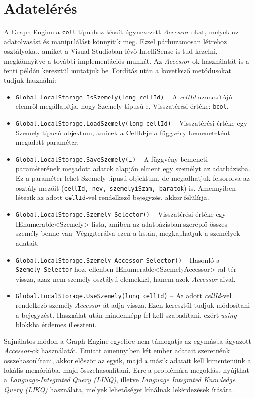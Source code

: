 \section{Adatelérés}

A Graph Engine a \texttt{cell} típushoz készít úgynevezett \emph{Accessor}-okat, melyek az adatolvasást és manipulálást könnyítik meg. Ezzel párhuzamosan létrehoz osztályokat, amiket a Visual Studioban lévő IntelliSense is tud kezelni, megkönnyítve a további implementációs munkát. Az \emph{Accessor}-ok használatát is a fenti példán keresztül mutatjuk be. Fordítás után a következő metódusokat tudjuk használni: 
\begin{itemize}
	\item \texttt{Global.LocalStorage.IsSzemely(long cellId)} \--- A \emph{cellId} azonosítójú elemről megállapítja, hogy Szemely típusú-e. Visszatérési értéke: \texttt{bool}.
	\item \texttt{Global.LocalStorage.LoadSzemely(long cellId)} \--- Visszatérési értéke egy Szemely típusú objektum, aminek a CellId-je a függvény bemeneteként megadott paraméter.
	\item \texttt{Global.LocalStorage.SaveSzemely(\ldots{})} \--- A függvény bemeneti paraméterének megadott adatok alapján elment egy személyt az adatbázisba. Ez a paraméter lehet Szemely típusú objektum, de megadhatjuk felsorolva az osztály mezőit (\texttt{cellId, nev, szemelyiSzam, baratok}) is. Amennyiben létezik az adott \texttt{cellId}-vel rendelkező bejegyzés, akkor felülírja.
	\item \texttt{Global.LocalStorage.Szemely\_Selector()} \--- Visszatérési értéke egy IEnumerable<Szemely> lista, amiben az adatbázisban szereplő összes személy benne van. Végigiterálva ezen a listán, megkaphatjuk a személyek adatait.
	\item \texttt{Global.LocalStorage.Szemely\_Accessor\_Selector()} \--- Hasonló a \texttt{Szemely\_Selector}-hoz, ellenben IEnumerable<SzemelyAccessor>-ral tér vissza, azaz nem személy osztályú elemekkel, hanem azok \emph{Accessor}-aival.
	\item \texttt{Global.LocalStorage.UseSzemely(long cellId)} \--- Az adott \emph{cellId}-vel rendelkező személy \emph{Accessor}-át adja vissza. Ezen keresztül tudjuk módosítani a bejegyzést. Használat után mindenképp fel kell szabadítani, ezért \emph{using} blokkba érdemes illeszteni.
\end{itemize}

Sajnálatos módon a Graph Engine egyelőre nem támogatja az egymásba ágyazott \emph{Accessor}-ok használatát. Emiatt amennyiben két ember adatait szeretnénk összehasonlítani, akkor először az egyik, majd a másik adatait kell kimentenünk a lokális memóriába, majd összehasonlítani. Erre a problémára megoldást nyújthat a \emph{Language-Integrated Query (LINQ)}, illetve \emph{Language Integrated Knowledge Query (LIKQ)} használata, melyek lehetőséget kínálnak lekérdezések írására.


